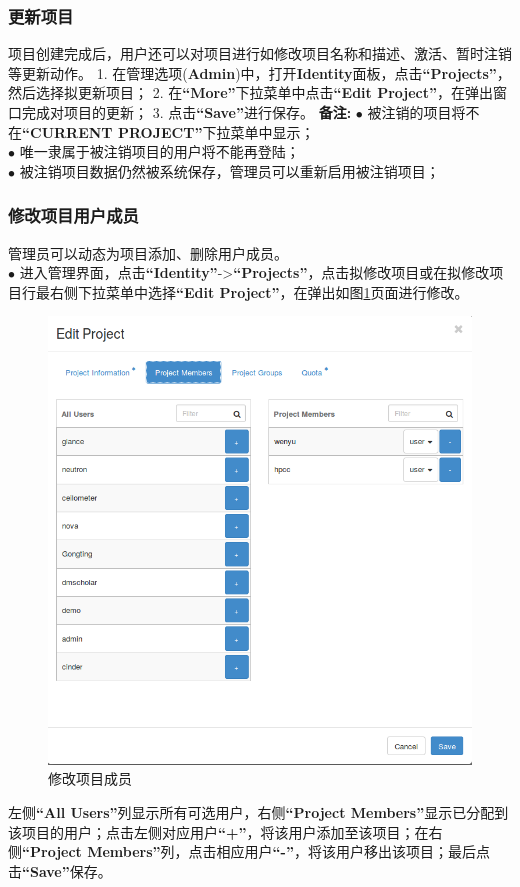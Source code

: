 \documentclass[12pt]{article}
\begin{document}
\subsubsection{更新项目}
项目创建完成后，用户还可以对项目进行如修改项目名称和描述、激活、暂时注销等更新动作。
1. 在管理选项(\textbf{Admin})中，打开\textbf{Identity}面板，点击\textbf{``Projects''}，然后选择拟更新项目；
2. 在\textbf{``More''}下拉菜单中点击\textbf{``Edit Project''}，在弹出窗口完成对项目的更新；
3. 点击\textbf{``Save''}进行保存。
\textbf{备注:}
$\bullet$ 被注销的项目将不在\textbf{``CURRENT PROJECT''}下拉菜单中显示；\\
$\bullet$ 唯一隶属于被注销项目的用户将不能再登陆；\\
$\bullet$ 被注销项目数据仍然被系统保存，管理员可以重新启用被注销项目；
\subsubsection{修改项目用户成员}
管理员可以动态为项目添加、删除用户成员。\\
$\bullet$ 进入管理界面，点击\textbf{``Identity''}->\textbf{``Projects''}，点击拟修改项目或在拟修改项目行最右侧下拉菜单中选择\textbf{``Edit Project''}，在弹出如图\ref{fig:editProject}页面进行修改。
\begin{figure}[!htb]
\centering
\includegraphics[width=6in]{./figures/editProject}
\caption{修改项目成员}
\label{fig:editProject}
\end{figure}
左侧\textbf{``All Users''}列显示所有可选用户，右侧\textbf{``Project Members''}显示已分配到该项目的用户；点击左侧对应用户\textbf{``+''}，将该用户添加至该项目；在右侧\textbf{``Project Members''}列，点击相应用户\textbf{``-''}，将该用户移出该项目；最后点击\textbf{``Save''}保存。
\end{document}
